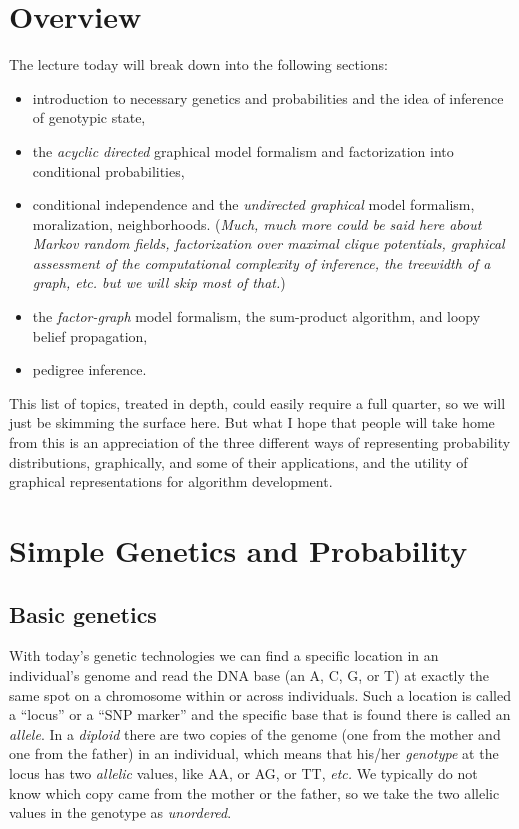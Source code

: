 \documentclass[11pt]{article}
\makeatletter
\newcommand{\etc}{{\em etc.}\@\xspace}
\makeatother
\begin{document}
\section{Overview}

The lecture today will break down into the following sections:
\begin{itemize}
\item introduction to necessary genetics and probabilities and the idea of inference of genotypic state,
\item the {\em acyclic directed} graphical model formalism and factorization into conditional probabilities,
\item conditional independence and the {\em undirected graphical} model formalism, moralization, 
neighborhoods.  ({\sl Much, much more could be said here about Markov random fields, 
factorization over maximal clique potentials,
graphical assessment of the computational complexity of inference, the treewidth of a graph,
etc. but we will skip most of that.})
\item the {\em factor-graph} model formalism, the sum-product algorithm, and loopy belief propagation,
\item pedigree inference.
\end{itemize}
This list of topics, treated in depth, could easily require a full quarter, so we will just be
skimming the
surface here. But what I hope that people will take home from this is an appreciation 
of the three different ways of representing probability distributions, graphically, and some of their
applications, and the utility of graphical representations for algorithm development.


\section{Simple Genetics and Probability}
\subsection{Basic genetics}
With today's genetic technologies we can find a specific location in an individual's genome and read the DNA base 
(an A, C, G, or T) at exactly the same spot on a chromosome within or across individuals.
Such a location is called a ``locus'' or a ``SNP marker'' and the specific base that is found there
is called an {\em allele}. In a {\em diploid} there are two copies of the genome 
(one from the mother and one from the father) in an individual, which means that his/her {\em genotype}
at the locus has two {\em allelic} values, like AA, or AG, or TT, \etc  
We typically do not know which copy came from the
mother or the father, so we take the two allelic values in the genotype as {\em unordered}.  
\end{document}
